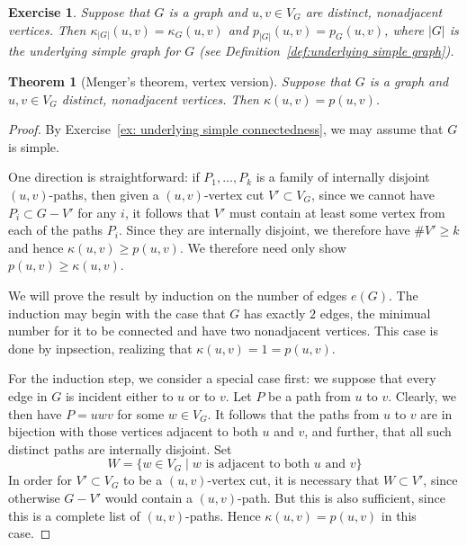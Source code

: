\documentclass[12pt]{report}
\theoremstyle{plain}
\newtheorem{thm}{Theorem}[section]
\newtheorem{exercise}{Exercise}[section]
\begin{document}
\begin{exercise} \label{ex: underlyin simple connectedness}
Suppose that $G$ is a graph and $u, v \in V_G$ are distinct, nonadjacent
vertices. Then $\kappa_{|G|}(u, v) = \kappa_G(u, v)$ and $p_{|G|}(u, v) =
p_G(u, v)$, where $|G|$ is the underlying simple graph for $G$ (see
Definition~\ref{def:underlying simple graph}).
\end{exercise}

\begin{thm}[Menger's theorem, vertex version]
Suppose that $G$ is a graph and $u, v \in V_G$ distinct, nonadjacent
vertices. Then $\kappa(u, v) = p(u, v)$.
\end{thm}
\begin{proof}
By Exercise~\ref{ex: underlying simple connectedness}, we may assume that
$G$ is simple.

One direction is straightforward: if $P_1, \ldots, P_k$ is a family of
internally disjoint $(u, v)$-paths, then given a $(u, v)$-vertex cut $V'
\subset V_G$, since we cannot have $P_i \subset G - V'$ for any $i$, it
follows that $V'$ must contain at least some vertex from each of the paths
$P_i$. Since they are internally disjoint, we therefore have $\#V' \geq k$
and hence $\kappa(u, v) \geq p(u, v)$. We therefore need only show $p(u, v)
\geq \kappa(u, v)$. 

We will prove the result by induction on the number of edges $e(G)$. The
induction may begin with the case that $G$ has exactly $2$ edges, the
minimual number for it to be connected and have two nonadjacent vertices.
This case is done by inpsection, realizing that $\kappa(u, v) = 1 = p(u,
v)$.

For the induction step, we consider a special case first: we suppose that
every edge in $G$ is incident either to $u$ or to $v$. Let $P$ be a path
from $u$ to $v$. Clearly, we then have $P = uwv$ for some $w \in V_G$. It
follows that the paths from $u$ to $v$ are in bijection with those vertices
adjacent to both $u$ and $v$, and further, that all such distinct paths are
internally disjoint. Set
\[
W = \{w \in V_G \mid \text{$w$ is adjacent to both $u$ and $v$}\}
\]
In order for $V' \subset V_G$ to be a $(u, v)$-vertex
cut, it is necessary that $W \subset V'$, since otherwise $G - V'$ would
contain a $(u, v)$-path. But this is also sufficient, since this is a
complete list of $(u, v)$-paths. Hence $\kappa(u, v) = p(u, v)$ in this
case.


\end{proof}
\end{document}
